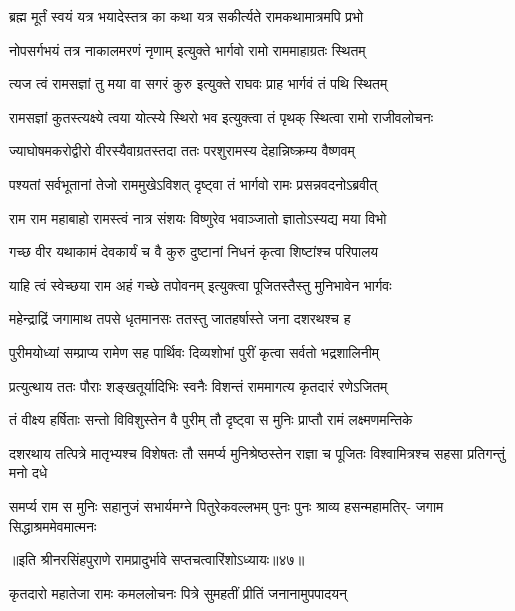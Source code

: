 \twolineshloka
{ब्रह्म मूर्तं स्वयं यत्र भयादेस्तत्र का कथा}
{यत्र सकीर्त्यते रामकथामात्रमपि प्रभो} %

\twolineshloka
{नोपसर्गभयं तत्र नाकालमरणं नृणाम्}
{इत्युक्ते भार्गवो रामो राममाहाग्रतः स्थितम्} %

\twolineshloka
{त्यज त्वं रामसज्ञां तु मया वा सगरं कुरु}
{इत्युक्ते राघवः प्राह भार्गवं तं पथि स्थितम्} %

\twolineshloka
{रामसज्ञां कुतस्त्यक्ष्ये त्वया योत्स्ये स्थिरो भव}
{इत्युक्त्वा तं पृथक् स्थित्वा रामो राजीवलोचनः} %

\twolineshloka
{ज्याघोषमकरोद्वीरो वीरस्यैवाग्रतस्तदा}
{ततः परशुरामस्य देहान्निष्क्रम्य वैष्णवम्} %

\twolineshloka
{पश्यतां सर्वभूतानां तेजो राममुखेऽविशत्}
{दृष्ट्वा तं भार्गवो रामः प्रसन्नवदनोऽब्रवीत्} %

\twolineshloka
{राम राम महाबाहो रामस्त्वं नात्र संशयः}
{विष्णुरेव भवाञ्जातो ज्ञातोऽस्यद्य मया विभो} %

\twolineshloka
{गच्छ वीर यथाकामं देवकार्यं च वै कुरु}
{दुष्टानां निधनं कृत्वा शिष्टांश्च परिपालय} %

\twolineshloka
{याहि त्वं स्वेच्छया राम अहं गच्छे तपोवनम्}
{इत्युक्त्वा पूजितस्तैस्तु मुनिभावेन भार्गवः} %

\twolineshloka
{महेन्द्राद्रिं जगामाथ तपसे धृतमानसः}
{ततस्तु जातहर्षास्ते जना दशरथश्च ह} %

\twolineshloka
{पुरीमयोध्यां सम्प्राप्य रामेण सह पार्थिवः}
{दिव्यशोभां पुरीं कृत्वा सर्वतो भद्रशालिनीम्} %

\twolineshloka
{प्रत्युत्थाय ततः पौराः शङ्खतूर्यादिभिः स्वनैः}
{विशन्तं राममागत्य कृतदारं रणेऽजितम्} %

\twolineshloka
{तं वीक्ष्य हर्षिताः सन्तो विविशुस्तेन वै पुरीम्}
{तौ दृष्ट्वा स मुनिः प्राप्तौ रामं लक्ष्मणमन्तिके} %

\threelineshloka
{दशरथाय तत्पित्रे मातृभ्यश्च विशेषतः}
{तौ समर्प्य मुनिश्रेष्ठस्तेन राज्ञा च पूजितः}
{विश्वामित्रश्च सहसा प्रतिगन्तुं मनो दधे} %

\fourlineindentedshloka
{समर्प्य राम स मुनिः सहानुजं}
{सभार्यमग्ने पितुरेकवल्लभम्}
{पुनः पुनः श्राव्य हसन्महामतिर्-}
{जगाम सिद्धाश्रममेवमात्मनः} %

॥इति श्रीनरसिंहपुराणे रामप्रादुर्भावे सप्तचत्वारिंशोऽध्यायः॥४७॥



\twolineshloka
{कृतदारो महातेजा रामः कमललोचनः}
{पित्रे सुमहतीं प्रीतिं जनानामुपपादयन्} %

